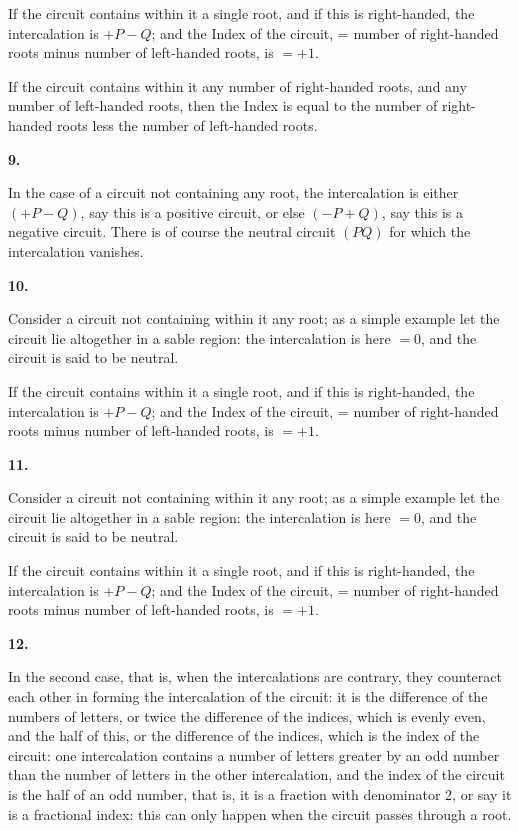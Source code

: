 \documentclass[12pt,a4paper]{article}
\theoremstyle{plain}
\theoremstyle{definition}
\begin{document}
If the circuit contains within it a single root, and if this is right-handed, the intercalation is $+P - Q$; and the Index of the circuit, = number of right-handed roots minus number of left-handed roots, is $= +1$.

If the circuit contains within it any number of right-handed roots, and any number of left-handed roots, then the Index is equal to the number of right-handed roots less the number of left-handed roots.

\textbf{9.}

In the case of a circuit not containing any root, the intercalation is either $(+P - Q)$, say this is a positive circuit, or else $(-P + Q)$, say this is a negative circuit. There is of course the neutral circuit $(PQ)$ for which the intercalation vanishes.

\textbf{10.}

Consider a circuit not containing within it any root; as a simple example let the circuit lie altogether in a sable region: the intercalation is here $= 0$, and the circuit is said to be neutral.

If the circuit contains within it a single root, and if this is right-handed, the intercalation is $+P - Q$; and the Index of the circuit, = number of right-handed roots minus number of left-handed roots, is $= +1$.

\newpage
\setcounter{page}{25}

\textbf{11.}

Consider a circuit not containing within it any root; as a simple example let the circuit lie altogether in a sable region: the intercalation is here $= 0$, and the circuit is said to be neutral.

If the circuit contains within it a single root, and if this is right-handed, the intercalation is $+P - Q$; and the Index of the circuit, = number of right-handed roots minus number of left-handed roots, is $= +1$.

\textbf{12.}

In the second case, that is, when the intercalations are contrary, they counteract each other in forming the intercalation of the circuit: it is the difference of the numbers of letters, or twice the difference of the indices, which is evenly even, and the half of this, or the difference of the indices, which is the index of the circuit: one intercalation contains a number of letters greater by an odd number than the number of letters in the other intercalation, and the index of the circuit is the half of an odd number, that is, it is a fraction with denominator 2, or say it is a fractional index: this can only happen when the circuit passes through a root.
\end{document}
